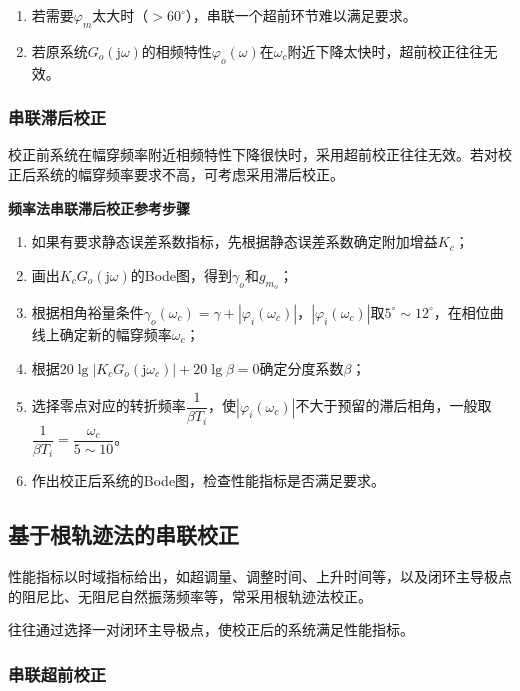 \documentclass[cn, blue, normal, 12pt]{elegantnote}
\begin{document}
\begin{enumerate}
    \setlength{\itemsep}{6pt}
    \item 若需要$\varphi_m$太大时（$>60^{\circ}$），串联一个超前环节难以满足要求。
    \item 若原系统$G_o(\mathrm{j}\omega)$的相频特性$\varphi_o(\omega)$在$\omega_c$附近下降太快时，超前校正往往无效。
\end{enumerate}

\subsubsection{串联滞后校正}

校正前系统在幅穿频率附近相频特性下降很快时，采用超前校正往往无效。若对校正后系统的幅穿频率要求不高，可考虑采用滞后校正。

\textbf{频率法串联滞后校正参考步骤}

\begin{enumerate}
    \setlength{\itemsep}{6pt}
    \item 如果有要求静态误差系数指标，先根据静态误差系数确定附加增益$K_{c}$；
    \item 画出$K_{c}G_o(\mathrm{j}\omega)$的Bode图，得到$\gamma_o$和$g_{m_o}$；
    \item 根据相角裕量条件$\gamma_o(\omega_c)=\gamma+|\varphi_i(\omega_c)|$，$|\varphi_i(\omega_c)|$取$5^{\circ}\sim 12^{\circ}$，在相位曲线上确定新的幅穿频率$\omega_c$；
    \item 根据$20\lg{|K_c G_o(\mathrm{j}\omega_c)|}+20\lg{\beta}=0$确定分度系数$\beta$；
    \item 选择零点对应的转折频率$\dfrac{1}{\beta T_i}$，使$|\varphi_i(\omega_c)|$不大于预留的滞后相角，一般取$\dfrac{1}{\beta T_i}=\dfrac{\omega_c}{5\sim 10}$。
    \item 作出校正后系统的Bode图，检查性能指标是否满足要求。
\end{enumerate}

\subsection{基于根轨迹法的串联校正}

性能指标以时域指标给出，如超调量、调整时间、上升时间等，以及闭环主导极点的阻尼比、无阻尼自然振荡频率等，常采用根轨迹法校正。

往往通过选择一对闭环主导极点，使校正后的系统满足性能指标。

\subsubsection{串联超前校正}
\end{document}

